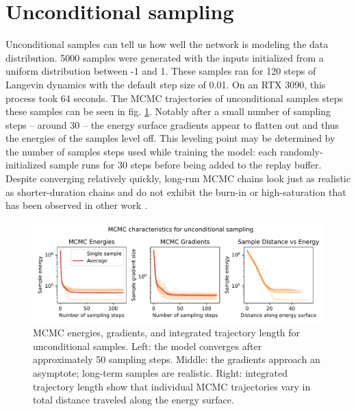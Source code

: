 \section{Unconditional sampling}

Unconditional samples can tell us how well the network is modeling the data distribution. 5000 samples were generated with the inputs initialized from a uniform distribution between -1 and 1. These samples ran for 120 steps of Langevin dynamics with the default step size of 0.01. On an RTX 3090, this process took 64 seconds. The MCMC trajectories of unconditional samples steps these samples can be seen in fig. \ref{fig:uncond_mcmc}. Notably after a small number of sampling steps -- around 30 -- the energy surface gradients appear to flatten out and thus the energies of the samples level off. This leveling point may be determined by the number of samples steps used while training the model: each randomly-initialized sample runs for 30 steps before being added to the replay buffer. Despite converging relatively quickly, long-run MCMC chains look just as realistic as shorter-duration chains and do not exhibit the burn-in or high-saturation that has been observed in other work \cite{du_implicit_2020}. 

\begin{figure}
	\centering
	\includegraphics[width=\linewidth]{figures/uncond_mcmc_diagnostics_39-0.pdf}
	\caption[MCMC energies, gradients, and integrated trajectory length for unconditional samples]{\label{fig:uncond_mcmc}MCMC energies, gradients, and integrated trajectory length for unconditional samples. Left: the model converges after approximately 50 sampling steps. Middle: the gradients approach an asymptote; long-term samples are realistic. Right: integrated trajectory length show that individual MCMC trajectories vary in total distance traveled along the energy surface.}
\end{figure}

